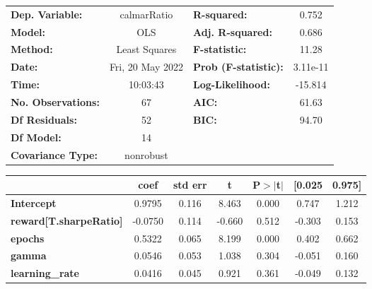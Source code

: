 \begin{center}
\begin{tabular}{lclc}
\toprule
\textbf{Dep. Variable:}              &   calmarRatio    & \textbf{  R-squared:         } &     0.752   \\
\textbf{Model:}                      &       OLS        & \textbf{  Adj. R-squared:    } &     0.686   \\
\textbf{Method:}                     &  Least Squares   & \textbf{  F-statistic:       } &     11.28   \\
\textbf{Date:}                       & Fri, 20 May 2022 & \textbf{  Prob (F-statistic):} &  3.11e-11   \\
\textbf{Time:}                       &     10:03:43     & \textbf{  Log-Likelihood:    } &   -15.814   \\
\textbf{No. Observations:}           &          67      & \textbf{  AIC:               } &     61.63   \\
\textbf{Df Residuals:}               &          52      & \textbf{  BIC:               } &     94.70   \\
\textbf{Df Model:}                   &          14      & \textbf{                     } &             \\
\textbf{Covariance Type:}            &    nonrobust     & \textbf{                     } &             \\
\bottomrule
\end{tabular}
\begin{tabular}{lcccccc}
                                     & \textbf{coef} & \textbf{std err} & \textbf{t} & \textbf{P$> |$t$|$} & \textbf{[0.025} & \textbf{0.975]}  \\
\midrule
\textbf{Intercept}                   &       0.9795  &        0.116     &     8.463  &         0.000        &        0.747    &        1.212     \\
\textbf{reward[T.sharpeRatio]}       &      -0.0750  &        0.114     &    -0.660  &         0.512        &       -0.303    &        0.153     \\
\textbf{epochs}                      &       0.5322  &        0.065     &     8.199  &         0.000        &        0.402    &        0.662     \\
\textbf{gamma}                       &       0.0546  &        0.053     &     1.038  &         0.304        &       -0.051    &        0.160     \\
\textbf{learning\_rate}              &       0.0416  &        0.045     &     0.921  &         0.361        &       -0.049    &        0.132     \\

\end{tabular}
\end{center}
